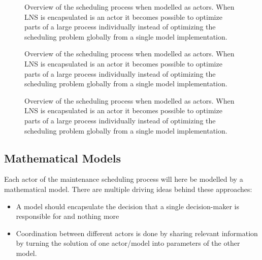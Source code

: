 \begin{figure}[H]
	\centering
	
	\resizebox{0.7\textwidth}{!}{
		\drawModelSetupHexagon[metaheuristics=true]
	}
	\caption{
		Overview of the scheduling process when modelled as actors. When LNS is encapsulated 
		is an actor it becomes possible to optimize parts of a large process individually instead of 
		optimizing the scheduling problem globally from a single model implementation.
	}
	\label{fig:ordinator-hexagon:metaheuristics}
\end{figure}

\begin{figure}[H]
	\centering
	
	\resizebox{0.7\textwidth}{!}{
		\drawModelSetupHexagon[orchestrator=true]
	}
	\caption{
		Overview of the scheduling process when modelled as actors. When LNS is encapsulated 
		is an actor it becomes possible to optimize parts of a large process individually instead of 
		optimizing the scheduling problem globally from a single model implementation.
	}
	\label{fig:ordinator-hexagon:orchestrator}
\end{figure}

\begin{figure}[H]
	\centering
	
	\resizebox{0.7\textwidth}{!}{
		\drawModelSetupHexagon[userinterface=true]
	}
	\caption{
		Overview of the scheduling process when modelled as actors. When LNS is encapsulated 
		is an actor it becomes possible to optimize parts of a large process individually instead of 
		optimizing the scheduling problem globally from a single model implementation.
	}
	\label{fig:ordinator-hexagon:userinterfaces}
\end{figure}

\subsection{Mathematical Models}
Each actor of the maintenance scheduling process will here be modelled by a mathematical model. There
are multiple driving ideas behind these approaches:
\begin{itemize}
	\item A model should encapsulate the decision that a single decision-maker is responsible for and
		nothing more
	\item Coordination between different actors is done by sharing relevant information 
		by turning the solution of one actor/model into parameters of the other model.
\end{itemize}

